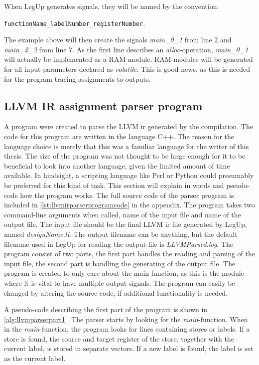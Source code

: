 When LegUp generates signals, they will be named by the convention:

\verb!functionName_labelNumber_registerNumber!. 

The example above will then create the signals \textit{main\_0\_1} from line 2 and \textit{main\_2\_3} from line 7. As the first line describes an \textit{alloc}-operation, \textit{main\_0\_1} will actually be implemented as a RAM-module. RAM-modules will be generated for all input-parameters declared as \textit{volatile}. This is good news, as this is needed for the program tracing assignments to outputs.
\subsection{\label{subsec:llvmirparserprogram}LLVM IR assignment parser program}
A program were created to parse the LLVM \gls{ir} generated by the compilation. The code for this program are written in the language C++. The reason for the language choice is merely that this was a familiar language for the writer of this thesis. The size of the program was not thought to be large enough for it to be beneficial to look into another language, given the limited amount of time available. In hindsight, a scripting language like Perl or Python could presumably be preferred for this kind of task. This section will explain in words and pseudo-code how the program works. The full source code of the parser program is included in \ref{lst:llvmirparserprogramcode} in the appendix. The program takes two command-line arguments when called, name of the input file and name of the output file. The input file should be the final LLVM \gls{ir} file generated by LegUp, named \textit{designName.ll}. The output filename can be anything, but the default filename used in LegUp for reading the output-file is \textit{LLVMParsed.log}. The program consist of two parts, the first part handles the reading and parsing of the input file, the second part is handling the generating of the output file. The program is created to only care about the main-function, as this is the module where it is vital to have multiple output signals. The program can easily be changed by altering the source code, if additional functionality is needed.

A pseudo-code describing the first part of the program is shown in \cref{alg:llvmparserpart1}. The parser starts by looking for the \textit{main}-function. When in the \textit{main}-function, the program looks for lines containing stores or labels. If a store is found, the source and target register of the store, together with the current label, is stored in separate vectors. If a new label is found, the label is set as the current label.

